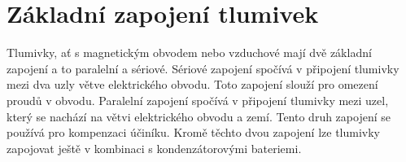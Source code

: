 \section{Základní zapojení tlumivek} Tlumivky, ať s magnetickým obvodem nebo vzduchové mají dvě základní zapojení a to paralelní a sériové. Sériové zapojení spočívá v připojení tlumivky mezi dva uzly větve elektrického obvodu. Toto zapojení slouží pro omezení proudů v obvodu. Paralelní zapojení spočívá  v připojení tlumivky mezi uzel, který se nachází na větvi elektrického obvodu a zemí. Tento druh zapojení se používá pro kompenzaci účiníku. Kromě těchto dvou zapojení lze tlumivky zapojovat ještě v kombinaci s kondenzátorovými bateriemi.